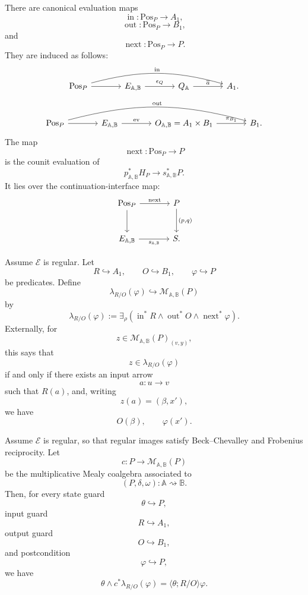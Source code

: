 There are canonical evaluation maps
\[
\operatorname{in}:\mathrm{Pos}_P\to A_1,
\]
\[
\operatorname{out}:\mathrm{Pos}_P\to B_1,
\]
and
\[
\operatorname{next}:\mathrm{Pos}_P\to P.
\]
They are induced as follows:
\[
\begin{tikzcd}[column sep=large]
\mathrm{Pos}_P
  \arrow[r]
  \arrow[rrr, bend left=15, "{\operatorname{in}}"]
&
E_{\mathbb A,\mathbb B}
  \arrow[r, "{\epsilon_Q}"]
&
Q_{\mathbb A}
  \arrow[r, "{\overline a}"]
&
A_1 .
\end{tikzcd}
\]
\[
\begin{tikzcd}[column sep=large]
\mathrm{Pos}_P
  \arrow[r]
  \arrow[rrr, bend left=15, "{\operatorname{out}}"]
&
E_{\mathbb A,\mathbb B}
  \arrow[r, "\operatorname{ev}"]
&
O_{\mathbb A,\mathbb B}=A_1\times B_1
  \arrow[r, "\pi_{B_1}"]
&
B_1 .
\end{tikzcd}
\]
The map
\[
\operatorname{next}:\mathrm{Pos}_P\to P
\]
is the counit evaluation of
\[
p_{\mathbb A,\mathbb B}^{\ast}H_P
\to
s_{\mathbb A,\mathbb B}^{\ast}P.
\]
It lies over the continuation-interface map:
\[
\begin{tikzcd}[column sep=large,row sep=large]
\mathrm{Pos}_P
  \arrow[r, "\operatorname{next}"]
  \arrow[d]
&
P
  \arrow[d, "{(p,q)}"]
\\
E_{\mathbb A,\mathbb B}
  \arrow[r, "s_{\mathbb A,\mathbb B}"']
&
S .
\end{tikzcd}
\]

\begin{definition}
\label{def:guarded-existential-response-lifting}
Assume \(\mathcal E\) is regular. Let
\[
R\hookrightarrow A_1,
\qquad
O\hookrightarrow B_1,
\qquad
\varphi\hookrightarrow P
\]
be predicates. Define
\[
\lambda_{R/O}(\varphi)
\hookrightarrow
\mathcal M_{\mathbb A,\mathbb B}(P)
\]
by
\[
\lambda_{R/O}(\varphi)
:=
\exists_{\rho}
\left(
\operatorname{in}^{\ast}R
\wedge
\operatorname{out}^{\ast}O
\wedge
\operatorname{next}^{\ast}\varphi
\right).
\]
Externally, for
\[
z\in \mathcal M_{\mathbb A,\mathbb B}(P)_{(v,y)},
\]
this says that
\[
z\in \lambda_{R/O}(\varphi)
\]
if and only if there exists an input arrow
\[
a:u\to v
\]
such that \(R(a)\), and, writing
\[
z(a)=(\beta,x'),
\]
we have
\[
O(\beta),
\qquad
\varphi(x').
\]
\end{definition}

\begin{proposition}
\label{prop:guarded-polynomial-span-agreement}
Assume \(\mathcal E\) is regular, so that regular images satisfy
Beck--Chevalley and Frobenius reciprocity. Let
\[
c:P\to\mathcal M_{\mathbb A,\mathbb B}(P)
\]
be the multiplicative Mealy coalgebra associated to
\[
(P,\delta,\omega):\mathbb A\rightsquigarrow\mathbb B.
\]
Then, for every state guard
\[
\theta\hookrightarrow P,
\]
input guard
\[
R\hookrightarrow A_1,
\]
output guard
\[
O\hookrightarrow B_1,
\]
and postcondition
\[
\varphi\hookrightarrow P,
\]
we have
\[
\theta\wedge c^\ast\lambda_{R/O}(\varphi)
=
\langle \theta;R/O\rangle\varphi.
\]
\end{proposition}

